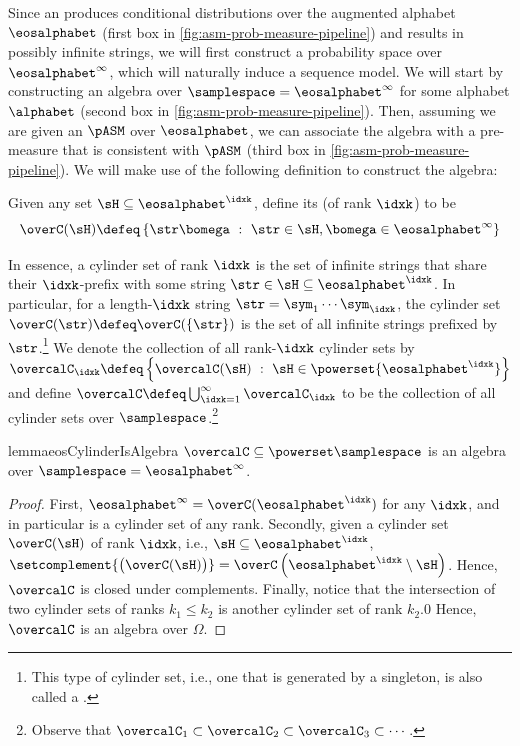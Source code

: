 Since an \autoregmodelAcronym produces conditional distributions over the augmented alphabet $\eosalphabet$ (first box in \cref{fig:asm-prob-measure-pipeline}) and results in possibly infinite strings, we will first construct a probability space over $\eosalphabet^\infty$, which will naturally induce a sequence model.
We will start by constructing an algebra over $\samplespace=\eosalphabet^\infty$ for some alphabet $\alphabet$ (second box in \cref{fig:asm-prob-measure-pipeline}). 
Then, assuming we are given an \autoregmodelAcronym $\pASM$ over $\eosalphabet$, we can associate the algebra with a pre-measure that is consistent with $\pASM$ (third box in \cref{fig:asm-prob-measure-pipeline}). 
We will make use of the following definition to construct the algebra:
\begin{definition}
Given any set $\sH\subseteq\eosalphabet^\idxk$, define its  (of rank $\idxk$) to be
\begin{equation} \label{eq:cylinder}
\overC(\sH)\defeq\left\{\str\bomega~:~\str\in \sH, \bomega\in\eosalphabet^\infty\right\}
\end{equation}
\end{definition}
In essence, a cylinder set of rank $\idxk$ is the set of infinite strings that share their $\idxk$-prefix with some string $\str \in \sH\subseteq\eosalphabet^\idxk$.
In particular, for a length-$\idxk$ string $\str=\sym_1\dotsm \sym_\idxk$, the cylinder set $\overC(\str)\defeq\overC(\{\str\})$ is the set of all infinite strings prefixed by $\str$.\footnote{This type of cylinder set, i.e., one that is generated by a singleton, is also called a .} 
We denote the collection of all rank-$\idxk$ cylinder sets by $\overcalC_\idxk\defeq\left\{\overcalC(\sH)~:~\sH\in\powerset{\eosalphabet^\idxk}\right\}$ and define $\overcalC \defeq \bigcup_{\idxk=1}^\infty\overcalC_\idxk$ to be the collection of all cylinder sets over $\samplespace$.\footnote{Observe that $\overcalC_1\subset\overcalC_2\subset\overcalC_3\subset\dotsm$.} 
\begin{restatable}{lemma}{eosCylinderIsAlgebra} \label{lem:cylinder-algebra}
$\overcalC\subseteq\powerset\samplespace$ is an algebra over $\samplespace=\eosalphabet^\infty$.
\end{restatable}
\begin{proof}
First, $\eosalphabet^\infty=\overC(\eosalphabet^\idxk)$ for any $\idxk$, and in particular is a cylinder set of any rank.
Secondly, given a cylinder set $\overC(\sH)$ of rank $\idxk$, i.e., $\sH\subseteq \eosalphabet^\idxk$, $\setcomplement{\big(\overC(\sH)\big)}=\overC\left(\eosalphabet^\idxk\setminus \sH\right)$. Hence, $\overcalC$ is closed under complements. 
Finally, notice that the intersection of two cylinder sets of ranks $k_1 \leq k_2$ is another cylinder set of rank $k_2$.0
Hence, $\overcalC$ is an algebra over $\Omega$.
\end{proof}
